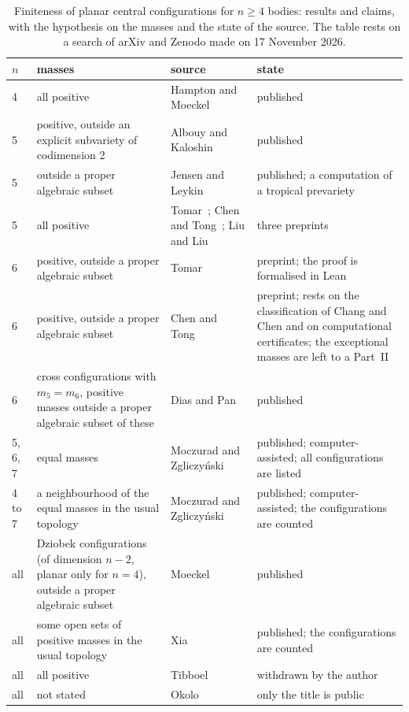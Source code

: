 \documentclass[11pt]{amsart}
\theoremstyle{definition}
\theoremstyle{remark}
\numberwithin{equation}{section}
\begin{document}
\begin{table}[ht]
\caption{Finiteness of planar central configurations for $n \ge 4$ bodies: results and claims, with the
hypothesis on the masses and the state of the source. The table rests on a search of arXiv and Zenodo
made on 17 November 2026.}\label{tab:known}
\small
\begin{tabular}{@{}l>{\raggedright}p{}>{\raggedright}p{}>{\raggedright\arraybackslash}p{}@{}}
\toprule
$n$ & masses & source & state \\
\midrule
4 & all positive & Hampton and Moeckel~\cite{hamptonmoeckel2006} & published \\
5 & positive, outside an explicit subvariety of codimension 2 & Albouy and Kaloshin~\cite{albouykaloshin2012} & published \\
5 & outside a proper algebraic subset & Jensen and Leykin~\cite{jensenleykin2025} & published; a computation of a tropical prevariety \\
5 & all positive & Tomar~\cite{tomar5}; Chen and Tong~\cite{chentong5}; Liu and Liu~\cite{liuliu5} & three preprints \\
6 & positive, outside a proper algebraic subset & Tomar~\cite{tomar6} & preprint; the proof is formalised in Lean \\
6 & positive, outside a proper algebraic subset & Chen and Tong~\cite{chentong6} & preprint; rests on the classification of Chang and Chen and on computational certificates; the exceptional masses are left to a Part~II \\
6 & cross configurations with $m_5 = m_6$, positive masses outside a proper algebraic subset of these & Dias and Pan~\cite{diaspan2020} & published \\
5, 6, 7 & equal masses & Moczurad and Zgliczy\'nski~\cite{moczuradzgliczynski2019} & published; computer-assisted; all configurations are listed \\
4 to 7 & a neighbourhood of the equal masses in the usual topology & Moczurad and Zgliczy\'nski~\cite{moczuradzgliczynski2020} & published; computer-assisted; the configurations are counted \\
all & Dziobek configurations (of dimension $n - 2$, planar only for $n = 4$), outside a proper algebraic subset & Moeckel~\cite{moeckel2001} & published \\
all & some open sets of positive masses in the usual topology & Xia~\cite{xia1991} & published; the configurations are counted \\
all & all positive & Tibboel~\cite{tibboel2013} & withdrawn by the author \\
all & not stated & Okolo~\cite{okolo2026} & only the title is public \\
\bottomrule
\end{tabular}
\end{table}
\end{document}
